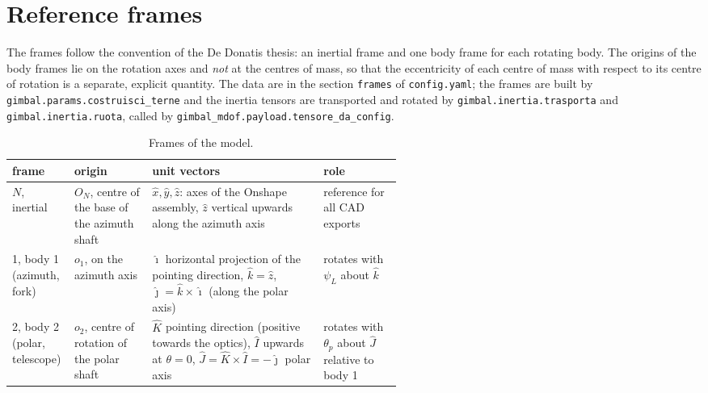 \documentclass[10pt,a4paper]{article}
\numberwithin{equation}{section}
\begin{document}
\section{Reference frames}\label{sec:frames}
The frames follow the convention of the De Donatis thesis: an inertial frame and one body frame for each rotating body. The origins of the body frames lie on the rotation axes and \emph{not} at the centres of mass, so that the eccentricity of each centre of mass with respect to its centre of rotation is a separate, explicit quantity. The data are in the section \texttt{frames} of \texttt{config.yaml}; the frames are built by \texttt{gimbal.params.costruisci\_terne} and the inertia tensors are transported and rotated by \texttt{gimbal.inertia.trasporta} and \texttt{gimbal.inertia.ruota}, called by \texttt{gimbal\_mdof.payload.tensore\_da\_config}.
\begin{table}[H]\centering\small
\caption{Frames of the model.}\label{tab:frames}
\begin{tabularx}{\linewidth}{L{0.16\linewidth}L{0.2\linewidth}YL{0.2\linewidth}}\toprule
frame & origin & unit vectors & role \\ \midrule
$N$, inertial & $O_N$, centre of the base of the azimuth shaft & $\hat x, \hat y, \hat z$: axes of the Onshape assembly, $\hat z$ vertical upwards along the azimuth axis & reference for all CAD exports \\
1, body 1 (azimuth, fork) & $o_1$, on the azimuth axis & $\hat\imath$ horizontal projection of the pointing direction, $\hat k = \hat z$, $\hat\jmath = \hat k\times\hat\imath$ (along the polar axis) & rotates with $\psi_L$ about $\hat k$ \\
2, body 2 (polar, telescope) & $o_2$, centre of rotation of the polar shaft & $\hat K$ pointing direction (positive towards the optics), $\hat I$ upwards at $\theta = 0$, $\hat J = \hat K\times\hat I = -\hat\jmath$ polar axis & rotates with $\theta_p$ about $\hat J$ relative to body 1 \\ \bottomrule
\end{tabularx}\end{table}
\end{document}
